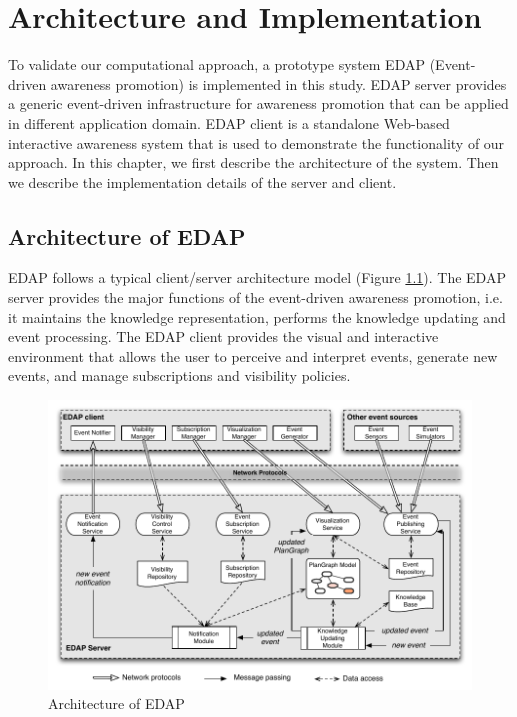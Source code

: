 \graphicspath{{Figures/}}

\chapter{Architecture and Implementation} %
\label{cha:system_implementation}
To validate our computational approach, a prototype system EDAP (Event-driven awareness promotion) is implemented in this study. EDAP server provides a generic event-driven infrastructure for awareness promotion that can be applied in different application domain. EDAP client is a standalone Web-based interactive awareness system that is used to demonstrate the functionality of our approach. In this chapter, we first describe the architecture of the system. Then we describe the implementation details of the server and client.

\section{Architecture of EDAP} %
\label{sec:architecture_of_edap}
EDAP follows a typical client/server architecture model (Figure \ref{fig:edap_architecture}). The EDAP server provides the major functions of the event-driven awareness promotion, i.e. it maintains the knowledge representation, performs the knowledge updating and event processing. The EDAP client provides the visual and interactive environment that allows the user to perceive and interpret events,  generate new events, and manage subscriptions and visibility policies.

\begin{figure}[htbp] %
	\centering
	\includegraphics{edap_architecture.pdf} 
	\caption{Architecture of EDAP}
	\label{fig:edap_architecture}
\end{figure}

